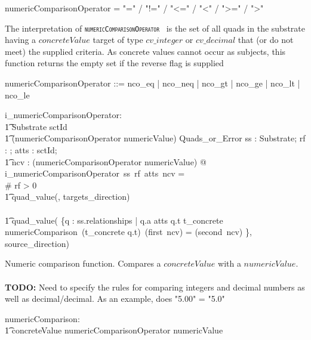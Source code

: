 \documentclass{article}
\def\spec#1{{\tt \small \textsc{{#1}} }}
\def\bnf#1{{\scriptsize {{#1}} }}
\begin{document}
\begin{framed}
\noindent
\bnf{numericComparisonOperator = "=" / "!=" / "\textless=" / "\textless" / "\textgreater=" / "\textgreater"}
\end{framed}

The interpretation of \spec{numericComparisonOperator} is the set of all quads in the substrate having a  $concreteValue$ target of type $cv\_integer$ or $cv\_decimal$ that (or do not meet) the supplied 
criteria. As concrete values cannot occur as subjects, this function returns the empty set if the reverse flag is supplied


\begin{zed}
numericComparisonOperator ::= nco\_eq | nco\_neq | nco\_gt | nco\_ge | nco\_lt | nco\_le
\end{zed}

\begin{gendef}
   i\_numericComparisonOperator: \\
\t1 Substrate \fun  \optional[reverseFlag] \fun \power sctId \fun \\
\t1 (numericComparisonOperator \cross numericValue) \fun Quads\_or\_Error
\where
    \forall ss : Substrate; rf : \optional[reverseFlag]; atts : \power sctId; \\
\t1 ncv : (numericComparisonOperator \cross numericValue)  @ \\
    i\_numericComparisonOperator~ss~rf~atts~ncv = \\
\IF \# rf > 0 \THEN \\
\t1 quad\_value(\emptyset, targets\_direction) \\
\ELSE \\
\t1 quad\_value( \{q : ss.relationships | q.a \in atts \land q.t \in \ran t\_concrete \land  \\
numericComparison~(t\_concrete \inv q.t)~(first~ncv) = (second~ncv) \}, source\_direction)
 \end{gendef}
 
 Numeric comparison function. Compares a $concreteValue$ with a $numericValue$.
 \paragraph{}
 \textbf{TODO:} Need to specify the rules for comparing integers and decimal numbers as well as decimal/decimal.  As an example, does "5.00" = "5.0"
 \begin{gendef}
    numericComparison: \\
\t1 concreteValue \fun numericComparisonOperator \pfun numericValue
 \end{gendef}
 
\end{document}
